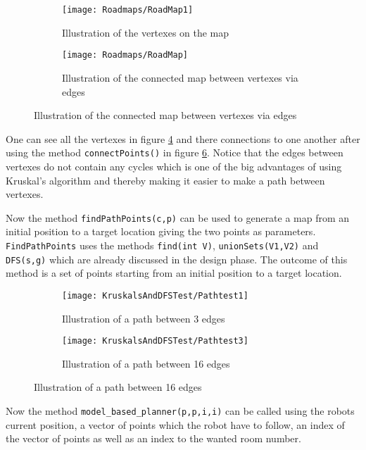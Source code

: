 \documentclass[../Head/Main.tex]{subfiles}
\begin{document}
  \begin{figure}[H]
   \begin{subfigure}[b]{0.49\textwidth}
    \centering
    \texttt{[image: Roadmaps/RoadMap1]}
    \caption{Illustration of the vertexes on the map}
    \label{fig:Vertexes}
  \end{subfigure}
  \hfill
   \begin{subfigure}[b]{0.49\textwidth}
    \centering
    \texttt{[image: Roadmaps/RoadMap]}
    \caption{Illustration of the connected map between vertexes via edges}
    \label{fig:VertexesAndEdges}
  \end{subfigure}
  \end{figure}  
  
One can see all the vertexes in figure \ref{fig:Vertexes} and there connections to one another after using the method \texttt{connectPoints()} in figure \ref{fig:VertexesAndEdges}. Notice that the edges between vertexes do not contain any cycles which is one of the big advantages of using Kruskal's algorithm and thereby making it easier to make a path between vertexes.  

Now the method \texttt{findPathPoints(c,p)} can be used to generate a map from an initial position to a target location giving the two points as parameters. \texttt{FindPathPoints} uses the methods \texttt{find(int V)}, \texttt{unionSets(V1,V2)} and \texttt{DFS(s,g)} which are already discussed in the design phase. The outcome of this method is a set of points starting from an initial position to a target location.        

  \begin{figure}[H]
   \begin{subfigure}[b]{0.49\textwidth}
    \centering
    \texttt{[image: KruskalsAndDFSTest/Pathtest1]}
    \caption{Illustration of a path between 3 edges}
    \label{fig:Vertexes}
  \end{subfigure}
  \hfill
   \begin{subfigure}[b]{0.49\textwidth}
    \centering
    \texttt{[image: KruskalsAndDFSTest/Pathtest3]}
    \caption{Illustration of a path between 16 edges}
    \label{fig:VertexesAndEdges}
  \end{subfigure}
  \end{figure}  

Now the method \texttt{model\_based\_planner(p,p,i,i)} can be called using the robots current position, a vector of points which the robot have to follow, an index of the vector of points as well as an index to the wanted room number. 
\end{document}
